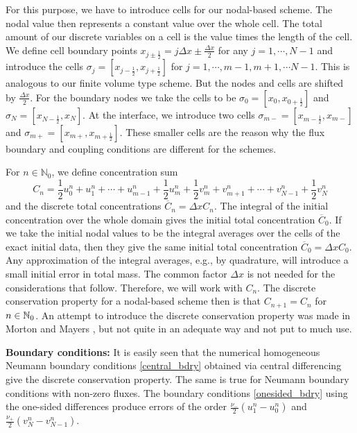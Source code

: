 For this purpose, we have to introduce cells for our nodal-based scheme. The nodal value then represents a constant
value over the whole cell. The total amount of our discrete variables on a cell is the value times the length of the cell. 
We define cell boundary points $x_{j\pm\frac 12} =j\Delta x\pm\frac{\Delta x}2$ for any $j=1,\cdots , N-1$
and introduce the cells $\sigma_j =[x_{j-\frac 12},x_{j+\frac 12}]$
for $j=1,\cdots ,m-1,m+1,\cdots N-1$. This is analogous to our finite volume type scheme. But the nodes and cells 
are shifted by $\frac{\Delta x}2$. For the boundary nodes
we take the cells to be $\sigma_0 =[x_0,x_{0+\frac 12}]$ and $\sigma_N=[x_{N-\frac 12}, x_N]$. At the interface, we introduce
two cells $\sigma_{m-}=[x_{m-\frac 12},x_{m-}]$ and $\sigma_{m+}=[x_{m+},x_{m+\frac 12}]$. 
These smaller cells are the reason why
the flux boundary and coupling conditions are different for the schemes.

For $n\in \mathbb{N}_0$, we define concentration sum
%
\begin{equation}
\label{dnc2}
C_n=\frac{1}{2}u^n_0+u^n_1+\cdots +u^n_{m-1}+\frac{1}{2}u^n_m+\frac{1}{2}v^n_m+v^n_{m+1}
+\cdots+v^n_{N-1}+\frac{1}{2}v^n_{N}
\end{equation}
%
and the discrete total concentrations $\overline{C}_n = \Delta x C_n$.
The integral of the initial concentration over the whole domain gives the initial total concentration $\overline{C}_0$.
If we take the initial nodal values to be the integral averages over the cells of the exact initial data, 
then they give the same initial total concentration $\overline{C}_0 = \Delta x C_0$. 
Any approximation of the integral averages, e.g.,  by quadrature, will introduce a small initial error in total mass.
The common factor $\Delta x$ is not needed for the considerations that follow. Therefore, we will work with $C_n$.
The { discrete conservation property} for a nodal-based scheme then is that $C_{n+1} = C_n$ for $n\in\mathbb{N}_0$.
An attempt to introduce the discrete conservation property was made in Morton and Mayers \cite[Section 2.14]{bMOMA}, 
but not quite in an adequate way and not put to much use.

\noindent
{\bf Boundary conditions:}
It is easily seen that the numerical homogeneous Neumann boundary conditions \eqref{central_bdry} obtained via central 
differencing give the discrete conservation property. The same is true for Neumann boundary conditions 
with non-zero fluxes. The boundary conditions \eqref{onesided_bdry} using the 
one-sided differences produce
errors of the order $\frac{\nu_-} 2(u_1^n-u_0^n)$ and $\frac{\nu_+} 2(v_N^n-v_{N-1}^n)$.

